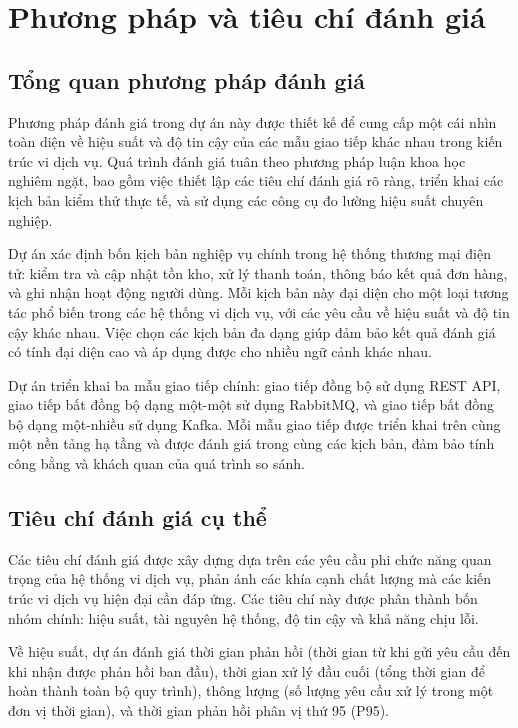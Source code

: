 \section{Phương pháp và tiêu chí đánh giá}

\subsection{Tổng quan phương pháp đánh giá}
Phương pháp đánh giá trong dự án này được thiết kế để cung cấp một cái nhìn toàn diện về hiệu suất và độ tin cậy của các mẫu giao tiếp khác nhau trong kiến trúc vi dịch vụ. Quá trình đánh giá tuân theo phương pháp luận khoa học nghiêm ngặt, bao gồm việc thiết lập các tiêu chí đánh giá rõ ràng, triển khai các kịch bản kiểm thử thực tế, và sử dụng các công cụ đo lường hiệu suất chuyên nghiệp.

Dự án xác định bốn kịch bản nghiệp vụ chính trong hệ thống thương mại điện tử: kiểm tra và cập nhật tồn kho, xử lý thanh toán, thông báo kết quả đơn hàng, và ghi nhận hoạt động người dùng. Mỗi kịch bản này đại diện cho một loại tương tác phổ biến trong các hệ thống vi dịch vụ, với các yêu cầu về hiệu suất và độ tin cậy khác nhau. Việc chọn các kịch bản đa dạng giúp đảm bảo kết quả đánh giá có tính đại diện cao và áp dụng được cho nhiều ngữ cảnh khác nhau.

Dự án triển khai ba mẫu giao tiếp chính: giao tiếp đồng bộ sử dụng REST API, giao tiếp bất đồng bộ dạng một-một sử dụng RabbitMQ, và giao tiếp bất đồng bộ dạng một-nhiều sử dụng Kafka. Mỗi mẫu giao tiếp được triển khai trên cùng một nền tảng hạ tầng và được đánh giá trong cùng các kịch bản, đảm bảo tính công bằng và khách quan của quá trình so sánh.

\subsection{Tiêu chí đánh giá cụ thể}
Các tiêu chí đánh giá được xây dựng dựa trên các yêu cầu phi chức năng quan trọng của hệ thống vi dịch vụ, phản ánh các khía cạnh chất lượng mà các kiến trúc vi dịch vụ hiện đại cần đáp ứng. Các tiêu chí này được phân thành bốn nhóm chính: hiệu suất, tài nguyên hệ thống, độ tin cậy và khả năng chịu lỗi.

Về hiệu suất, dự án đánh giá thời gian phản hồi (thời gian từ khi gửi yêu cầu đến khi nhận được phản hồi ban đầu), thời gian xử lý đầu cuối (tổng thời gian để hoàn thành toàn bộ quy trình), thông lượng (số lượng yêu cầu xử lý trong một đơn vị thời gian), và thời gian phản hồi phân vị thứ 95 (P95).

